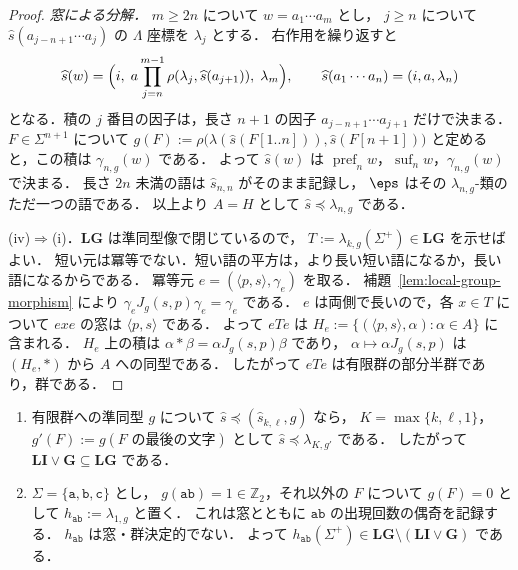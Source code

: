 \begin{proof}
\emph{窓による分解．}
$m\ge2n$ について $w=a_1\cdots a_m$ とし，
$j\ge n$ について $\widehat{s}(a_{j-n+1}\cdots a_j)$ の $\Lambda$ 座標を $\lambda_j$ とする．
右作用を繰り返すと
\[
 \widehat{s}(w)=\Bigl(i,\;a\prod_{j=n}^{m-1}\rho(\lambda_j,\widehat{s}(a_{j+1})),\;
 \lambda_m\Bigr),
 \qquad \widehat{s}(a_1\cdots a_n)=(i,a,\lambda_n)
\]
となる．積の $j$ 番目の因子は，長さ $n+1$ の因子 $a_{j-n+1}\cdots a_{j+1}$ だけで決まる．
$F\in\Sigma^{n+1}$ について
$g(F):=\rho\bigl(\lambda(\widehat{s}(F[1..n])),\widehat{s}(F[n+1])\bigr)$ と定めると，この積は $\gamma_{n,g}(w)$ である．
よって $\widehat{s}(w)$ は $\operatorname{pref}_n w$，$\operatorname{suf}_n w$，$\gamma_{n,g}(w)$ で決まる．
長さ $2n$ 未満の語は $\widehat{s}_{n,n}$ がそのまま記録し，
$\eps$ はその $\lambda_{n,g}$-類のただ一つの語である．
以上より $A=H$ として $\widehat{s}\preceq\lambda_{n,g}$ である．

(iv)$\Rightarrow$(i)．$\mathbf{LG}$ は準同型像で閉じているので，
$T:=\lambda_{k,g}(\Sigma^+)\in\mathbf{LG}$ を示せばよい．
短い元は冪等でない．短い語の平方は，より長い短い語になるか，長い語になるからである．
冪等元 $e=(\langle p,s\rangle,\gamma_e)$ を取る．
補題~\ref{lem:local-group-morphism} により $\gamma_eJ_g(s,p)\gamma_e=\gamma_e$ である．
$e$ は両側で長いので，各 $x\in T$ について $exe$ の窓は $\langle p,s\rangle$ である．
よって $eTe$ は $H_e:=\{(\langle p,s\rangle,\alpha):\alpha\in A\}$ に含まれる．
$H_e$ 上の積は $\alpha*\beta=\alpha J_g(s,p)\beta$ であり，
$\alpha\mapsto\alpha J_g(s,p)$ は $(H_e,*)$ から $A$ への同型である．
したがって $eTe$ は有限群の部分半群であり，群である．
\end{proof}

\begin{proposition}
\label{prop:li-g-strict}
\begin{enumerate}[label=\textup{(\roman*)},leftmargin=*]
\item 有限群への準同型 $g$ について $\widehat{s}\preceq(\widehat{s}_{k,\ell},g)$ なら，
$K=\max\{k,\ell,1\}$，$g'(F):=g(F\text{ の最後の文字})$ として $\widehat{s}\preceq\lambda_{K,g'}$ である．
したがって $\mathbf{LI}\vee\mathbf G\subseteq\mathbf{LG}$ である．
\item $\Sigma=\{\mathtt a,\mathtt b,\mathtt c\}$ とし，
$g(\mathtt{ab})=1\in\mathbb Z_2$，それ以外の $F$ について $g(F)=0$ として
$h_{\mathtt{ab}}:=\lambda_{1,g}$ と置く．
これは窓とともに $\mathtt{ab}$ の出現回数の偶奇を記録する．
$h_{\mathtt{ab}}$ は窓・群決定的でない．
よって $h_{\mathtt{ab}}(\Sigma^+)\in\mathbf{LG}\setminus(\mathbf{LI}\vee\mathbf G)$ である．
\end{enumerate}
\end{proposition}

